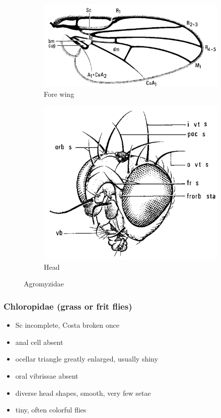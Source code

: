\documentclass[letterpaper, 11pt]{article}
\begin{document}
\begin{figure}[ht!]
    \centering
    \begin{subfigure}[ht!]{0.45\textwidth}
        \includegraphics[width=\textwidth]{AgromyzidWing}
        \caption{Fore wing \citep[][Fig. 73.9]{mcalpine1981manualv2}}
        \label{fig:agromyzid1}
    \end{subfigure}
    \qquad
    \begin{subfigure}[ht!]{0.3\textwidth}
        \includegraphics[width=\textwidth]{AgromyzidHead}
        \caption{Head \citep[][Fig. 73.2]{mcalpine1981manualv2}}
        \label{fig:agromyzid2}
    \end{subfigure}
    \caption{Agromyzidae}\label{fig:agromyzids}
\end{figure}

\subsubsection{Chloropidae (grass or frit flies)}
\begin{itemize}
\item Sc incomplete, Costa broken once
\item anal cell absent
\item ocellar triangle greatly enlarged, usually shiny
\item oral vibrissae absent
\item diverse head shapes, smooth, very few setae
\item tiny, often colorful flies
\end{itemize}
\end{document}
